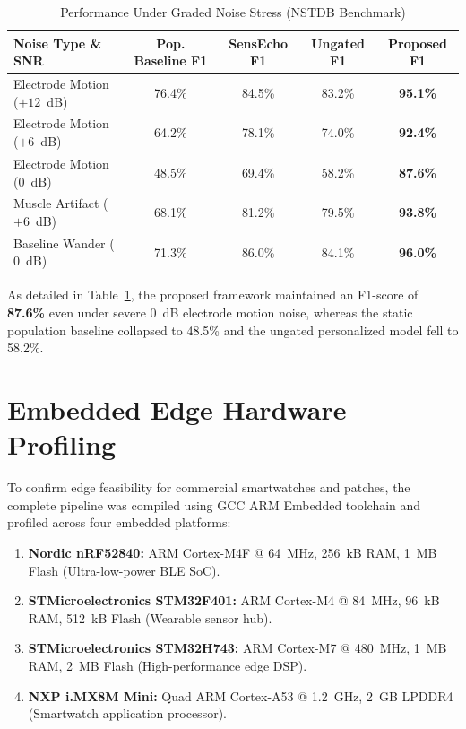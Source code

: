 \documentclass{ieeeaccess}
\begin{document}
\begin{table}[t]
\caption{Performance Under Graded Noise Stress (NSTDB Benchmark)}
\label{tab:noise_stress}
\centering
\scriptsize
\renewcommand{\arraystretch}{1.2}
\begin{tabularx}{\columnwidth}{l c c c c}
\toprule
\textbf{Noise Type \& SNR} & \textbf{Pop. Baseline F1} & \textbf{SensEcho F1} & \textbf{Ungated F1} & \textbf{Proposed F1} \\
\midrule
Electrode Motion ($+12$~dB) & 76.4\% & 84.5\% & 83.2\% & \textbf{95.1\%} \\
Electrode Motion ($+6$~dB) & 64.2\% & 78.1\% & 74.0\% & \textbf{92.4\%} \\
Electrode Motion ($0$~dB) & 48.5\% & 69.4\% & 58.2\% & \textbf{87.6\%} \\
Muscle Artifact ($+6$~dB) & 68.1\% & 81.2\% & 79.5\% & \textbf{93.8\%} \\
Baseline Wander ($0$~dB) & 71.3\% & 86.0\% & 84.1\% & \textbf{96.0\%} \\
\bottomrule
\end{tabularx}
\end{table}

As detailed in Table~\ref{tab:noise_stress}, the proposed framework maintained an F1-score of \textbf{87.6\%} even under severe $0$~dB electrode motion noise, whereas the static population baseline collapsed to 48.5\% and the ungated personalized model fell to 58.2\%.

\section{Embedded Edge Hardware Profiling}
\label{sec:edge}

To confirm edge feasibility for commercial smartwatches and patches, the complete pipeline was compiled using GCC ARM Embedded toolchain and profiled across four embedded platforms:
\begin{enumerate}
\item \textbf{Nordic nRF52840:} ARM Cortex-M4F @ 64~MHz, 256~kB RAM, 1~MB Flash (Ultra-low-power BLE SoC).
\item \textbf{STMicroelectronics STM32F401:} ARM Cortex-M4 @ 84~MHz, 96~kB RAM, 512~kB Flash (Wearable sensor hub).
\item \textbf{STMicroelectronics STM32H743:} ARM Cortex-M7 @ 480~MHz, 1~MB RAM, 2~MB Flash (High-performance edge DSP).
\item \textbf{NXP i.MX8M Mini:} Quad ARM Cortex-A53 @ 1.2~GHz, 2~GB LPDDR4 (Smartwatch application processor).
\end{enumerate}
\end{document}

